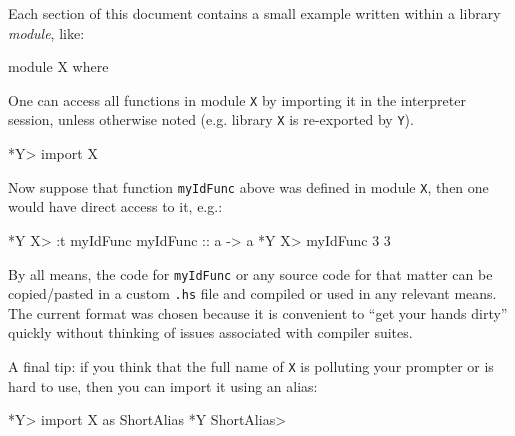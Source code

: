 Each section of this document contains a small example written within a library \emph{module}, like:
\begin{code}
module X where
\end{code}
One can access all functions in module \texttt{X} by importing it in the interpreter session, unless otherwise noted (e.g. library \texttt{X} is re-exported by \texttt{Y}).
\begin{interactive}
*Y> import X
\end{interactive}
Now suppose that function \texttt{myIdFunc} above was defined in module \texttt{X}, then one would have direct access to it, e.g.:
\begin{interactive}
*Y X> :t myIdFunc
myIdFunc :: a -> a
*Y X> myIdFunc 3
3  
\end{interactive}
By all means, the code for \texttt{myIdFunc} or any source code for that matter can be copied/pasted in a custom \texttt{.hs} file and compiled or used in any relevant means. The current format was chosen because it is convenient to ``get your hands dirty'' quickly without thinking of issues associated with compiler suites.

A final tip: if you think that the full name of \texttt{X} is polluting your prompter or is hard to use, then you can import it using an alias:
\begin{interactive}
*Y> import X as ShortAlias
*Y ShortAlias> 
\end{interactive}